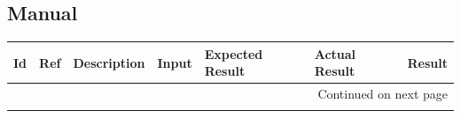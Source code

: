 \documentclass[12pt, titlepage]{article}
\begin{document}
\subsection{Manual}
\begin{longtable}{|p{1.4cm}|p{1.0cm}|p{2.5cm}|p{1.5cm}|p{2.2cm}|p{2cm}|p{1.2cm}|}

  \endfirsthead
  \hline
  \textbf{Id} & \textbf{Ref} & \textbf{Description}                                                         & \textbf{Input}                                    & \textbf{Expected Result}                                    & \textbf{Actual Result} & \textbf{Result}                                    \\ \hline

  \endhead

  \hline \multicolumn{7}{|r|}{Continued on next page} \\ \hline
  \endfoot
   

\end{longtable}
\end{document}
